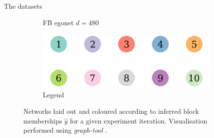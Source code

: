 \documentclass{beamer}
\begin{document}
\begin{frame}{The datasets}
\begin{figure}[!h]
\begin{subfigure}[t]{0.3\linewidth}
				\caption{FB egonet $d=480$}
				\label{fig:fb-graph}
			\end{subfigure}
			\begin{subfigure}[t]{0.4\linewidth}
				\centering
				\includegraphics[width=0.8\linewidth]{10-horizontal-legend.png}
				\caption{Legend}
				\label{fig:10-legend}
			\end{subfigure}
			\caption{Networks laid out and coloured according to inferred block memberships $\hat{y}$ for a given experiment iteration. Visualisation performed using \textit{graph-tool} \cite{peixoto_graph-tool_2014}.}
			\label{fig:graphs-all}
		\end{figure}
	\end{frame}
\end{document}
